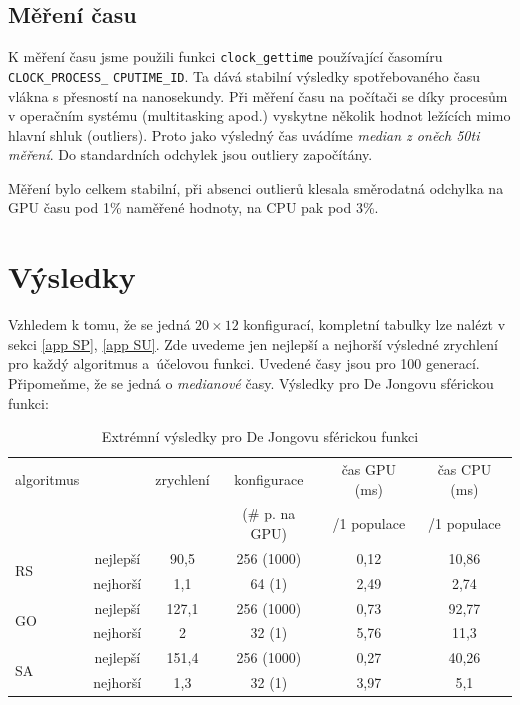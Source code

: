 \subsection{Měření času}

K měření času jsme použili funkci \texttt{clock\_gettime} používající časomíru \texttt{CLOCK\_PROCESS\_} \texttt{CPUTIME\_ID}. Ta dává stabilní výsledky spotřebovaného času vlákna s přesností na nanosekundy. Při měření času na počítači se díky procesům v operačním systému (multitasking apod.) vyskytne několik hodnot ležících mimo hlavní shluk (outliers). Proto jako výsledný čas uvádíme \emph{median z oněch 50ti měření}. Do standardních odchylek jsou outliery započítány.

Měření bylo celkem stabilní, při absenci outlierů klesala směrodatná odchylka na GPU času pod 1\% naměřené hodnoty, na CPU pak pod 3\%.

\section{Výsledky}\label{vysledky}

Vzhledem k tomu, že se jedná $20\times 12$ konfigurací, kompletní tabulky lze nalézt v sekci \ref{app SP}, \ref{app SU}. Zde uvedeme jen nejlepší a nejhorší výsledné zrychlení pro každý algoritmus a~účelovou funkci. Uvedené časy jsou pro 100 generací. Připomeňme, že se jedná o \emph{medianové} časy. Výsledky pro De Jongovu sférickou funkci:

\begin{table}[h]
    \begin{center}
    \begin{tabular}{lccccc}
      \toprule
      algoritmus &  & zrychlení & konfigurace & čas GPU (ms) & čas CPU (ms) \\
      & & & (\# p. na GPU) & /1 populace & /1 populace \\
      \midrule
      \multirow{2}{*}{RS} & nejlepší & 90,5 & 256 (1000) & 0,12 & 10,86 \\
                        & nejhorší & 1,1 & 64 (1) & 2,49 & 2,74\\
      \multirow{2}{*}{GO} & nejlepší & 127,1 & 256 (1000) & 0,73 & 92,77\\
                        & nejhorší & 2 & 32 (1) & 5,76 & 11,3\\
      \multirow{2}{*}{SA} & nejlepší & 151,4 & 256 (1000) & 0,27 & 40,26 \\
                        & nejhorší & 1,3 & 32 (1) & 3,97 & 5,1\\
      \bottomrule
    \end{tabular}
    \caption{Extrémní výsledky pro De Jongovu sférickou funkci}
    \end{center}
\end{table}

